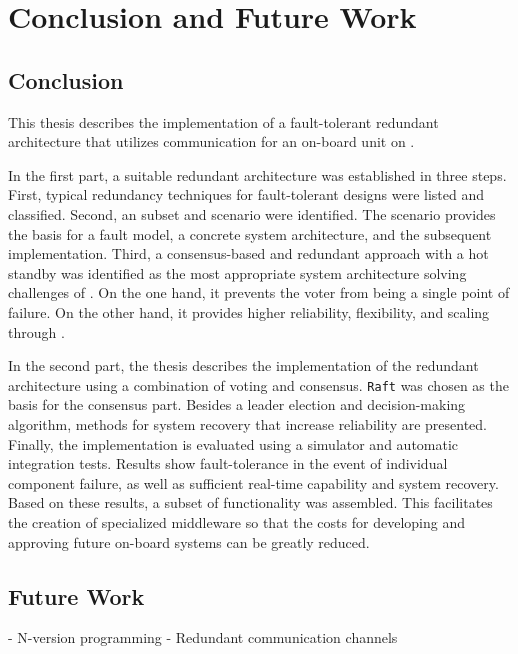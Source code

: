 \chapter{Conclusion and Future Work}

\section{Conclusion}
This thesis describes the implementation of a fault-tolerant redundant architecture that utilizes  communication for an  on-board unit on .

In the first part, a suitable redundant architecture was established in three steps.
First, typical redundancy techniques for fault-tolerant designs were listed and classified.
Second, an  subset and scenario were identified.
The scenario provides the basis for a fault model, a concrete system architecture, and the subsequent implementation.
Third, a consensus-based and redundant approach with a hot standby was identified as the most appropriate system architecture solving challenges of .
On the one hand, it prevents the voter from being a single point of failure.
On the other hand, it provides higher reliability, flexibility, and scaling through .

In the second part, the thesis describes the implementation of the redundant architecture using a combination of voting and consensus.
\texttt{Raft} was chosen as the basis for the consensus part.
Besides a leader election and decision-making algorithm, methods for system recovery that increase reliability are presented.
Finally, the implementation is evaluated using a simulator and automatic integration tests.
Results show fault-tolerance in the event of individual component failure, as well as sufficient real-time capability and system recovery.
Based on these results, a subset of  functionality was assembled.
This facilitates the creation of specialized  middleware so that the costs for developing and approving future  on-board systems can be greatly reduced.


\iffalse


- Feasibility of DCPS such as DDS for time- and safety-critical ETCS on-board units
- Aim is to use redundancy and thereby use less safe components
	- DDS as enabler for distributed computation and redundancy

- Then, different redundancy concepts are explained and weighted against each other regarding reliability, safety, and performance
- To find the best for a safety-critical DDS application 




    Clearly state the answer to the main research question
    Summarize and reflect on the research
    Make recommendations for future work on the topic
    Show what new knowledge you have contributed
    
\fi


\section{Future Work}
- N-version programming
- Redundant communication channels